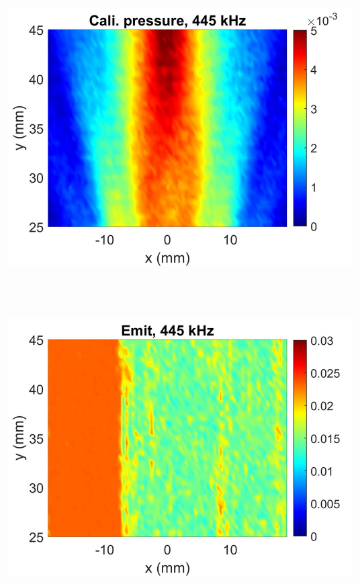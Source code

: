 \documentclass{article}
\begin{document}
\begin{figure}[!htb]
\begin{subfigure}{0.32\textwidth}
        \caption{}
    \end{subfigure}
    \begin{subfigure}{0.32\textwidth}
        \centering
        \includegraphics[width = \textwidth]{../../matlab/exp/fig/AnalyzeData_230227D_Exp230223B_CaliRecPrs.jpg}
        \caption{}
    \end{subfigure}
    \\
    \begin{subfigure}{0.32\textwidth}
        \centering
        \includegraphics[width = \textwidth]{../../matlab/exp/fig/AnalyzeData_230227D_Exp230227B_EmitPrs}
        \caption{}
    \end{subfigure}
    \begin{subfigure}{0.32\textwidth}

\end{subfigure}
\end{figure}
\end{document}
